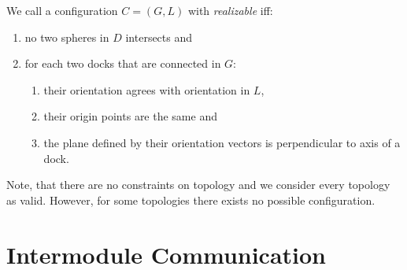 We call a configuration $C = (G, L)$ with \emph{realizable} iff:
\begin{enumerate}
    \item no two spheres in $D$ intersects and
    \item for each two docks that are connected in $G$:
        \begin{enumerate}
            \item their orientation agrees with orientation in $L$,
            \item their origin points are the same and
            \item the plane defined by their orientation vectors is perpendicular to axis of a dock.
        \end{enumerate}
\end{enumerate}
Note, that there are no constraints on topology and we consider every topology
as valid. However, for some topologies there exists no possible configuration.

\section{Intermodule Communication}\label{sec:communication}

